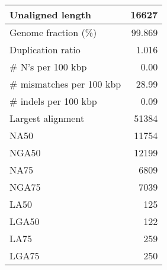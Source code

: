 \documentclass[12pt,a4paper]{article}
\begin{document}
\begin{table}[ht]
\begin{center}
\begin{tabular}{|l*{1}{|r}|}
Unaligned length & 16627 \\ \hline
Genome fraction (\%) & 99.869 \\ \hline
Duplication ratio & 1.016 \\ \hline
\# N's per 100 kbp & 0.00 \\ \hline
\# mismatches per 100 kbp & 28.99 \\ \hline
\# indels per 100 kbp & 0.09 \\ \hline
Largest alignment & 51384 \\ \hline
NA50 & 11754 \\ \hline
NGA50 & 12199 \\ \hline
NA75 & 6809 \\ \hline
NGA75 & 7039 \\ \hline
LA50 & 125 \\ \hline
LGA50 & 122 \\ \hline
LA75 & 259 \\ \hline
LGA75 & 250 \\ \hline
\end{tabular}
\end{center}
\end{table}
\end{document}

